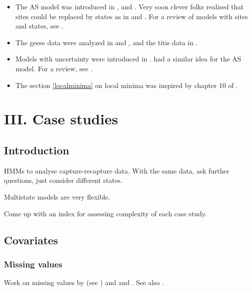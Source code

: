 \documentclass[
  12pt,
]{krantz}
\begin{document}
\begin{itemize}
\item
  The AS model was introduced in \citet{arnason1972}, \citet{arnason1973} and \citet{SchwarzEtAl1993}. Very soon clever folks realised that sites could be replaced by states as in \citet{NicholsEtAl1992} and \citet{NicholsEtAl1994}. For a review of models with sites and states, see \citet{LebretonEtAl2009}.
\item
  The geese data were analyzed in \citet{hestbeck1991estimates} and \citet{BrownieEtAl1993}, and the titis data in \citet{scofield2001titi}.
\item
  Models with uncertainty were introduced in \citet{pradel_multievent_2005}. \citet{dupuis_bayesian_1995} had a similar idea for the AS model. For a review, see \citet{gimenez_estimating_2012}.
\item
  The section \ref{localminima} on local minima was inspired by chapter 10 of \citet{cooch2017intromark}.
\end{itemize}

\hypertarget{part-iii.-case-studies}{%
\part{III. Case studies}\label{part-iii.-case-studies}}

\hypertarget{introduction-7}{%
\chapter*{Introduction}\label{introduction-7}}


HMMs to analyse capture-recapture data. With the same data, ask further questions, just consider different states.

Multistate models are very flexible.

Come up with an index for assessing complexity of each case study.

\hypertarget{covariateschapter}{%
\chapter{Covariates}\label{covariateschapter}}

\hypertarget{missing-values}{%
\section{Missing values}\label{missing-values}}

Work on missing values by \citet{bonner2006} (see \citet{gimenez2009winbugs}) and \citet{langrock2013maximum} and \citet{worthington2015}. See also \citet{rose2018}.
\end{document}
